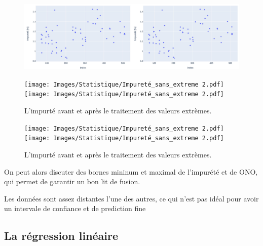 \documentclass[12pt]{article}
\begin{document}
\begin{figure}[H]
    \centering
    \begin{adjustbox}{width=1.3\textwidth,center}
        \includegraphics[scale=1]{Images/Statistique/Essais.pdf}
    \end{adjustbox}
\end{figure}


\begin{figure}[H]
    \centering
    \begin{adjustbox}{width=1.3\textwidth,center}
        \texttt{[image: Images/Statistique/Impureté\_sans\_extreme 2.pdf]}
        \texttt{[image: Images/Statistique/Impureté\_sans\_extreme 2.pdf]}
    \end{adjustbox}
    \caption{L'impurté avant et après le traitement des valeurs extrèmes.}
    \label{fig:Extreme}
\end{figure}



\begin{figure}[H]
    \centering
    \begin{adjustbox}{width=1.3\textwidth,center}
        \texttt{[image: Images/Statistique/Impureté\_sans\_extreme 2.pdf]}
        \texttt{[image: Images/Statistique/Impureté\_sans\_extreme 2.pdf]}
    \end{adjustbox}
    \caption{L'impurté avant et après le traitement des valeurs extrèmes.}
    \label{fig:Extremem}
\end{figure}


On peut alors discuter des bornes mininum et maximal de l'impurété et de ONO,
qui permet de garantir un bon lit de fusion.

Les données sont assez distantes l'une des autres, ce qui n'est pas idéal pour
avoir un intervale de confiance et de prediction fine


\subsection{La régression linéaire }
\end{document}
